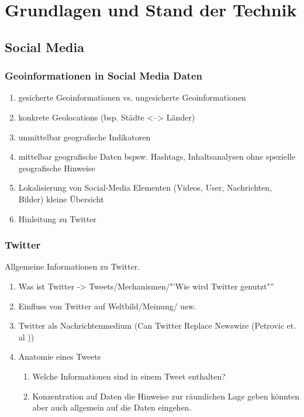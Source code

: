 \chapter{Grundlagen und Stand der Technik} 


	\section{Social Media}

		\subsection{Geoinformationen in Social Media Daten}
	 		\begin{enumerate}
	 			\item {} gesicherte Geoinformationen vs. ungesicherte Geoinformationen
	 			\item konkrete Geolocations (bsp. Städte <--> Länder) \cite{Hecht:2011:TJB:1978942.1978976}
	 			\item unmittelbar geografische Indikatoren
				\item mittelbar geografische Daten bspsw. Hashtags, Inhaltsanalysen ohne spezielle geografische Hinweise
	 			\item Lokalisierung von Social-Media Elementen (Videos, User, Nachrichten, Bilder) kleine Übersicht
	 			\item Hinleitung zu Twitter  
	 		\end{enumerate}

		\subsection{Twitter}
			Allgemeine Informationen zu Twitter. 
			\begin{enumerate}
				\item Was ist Twitter -> Tweets/Mechanismen/"'Wie wird Twitter genutzt"''
				\item {} Einfluss von Twitter auf Weltbild/Meinung/ usw.
				\item Twitter als Nachrichtenmedium (Can Twitter Replace Newswire (Petrovic et. al ))
				\item Anatomie eines Tweets 
					\begin{enumerate}
						\item Welche Informationen sind in einem Tweet enthalten? 
						\item Konzentration auf Daten die Hinweise zur räumlichen Lage geben könnten aber auch allgemein auf die Daten eingehen.
					\end{enumerate}
			\end{enumerate}
	
